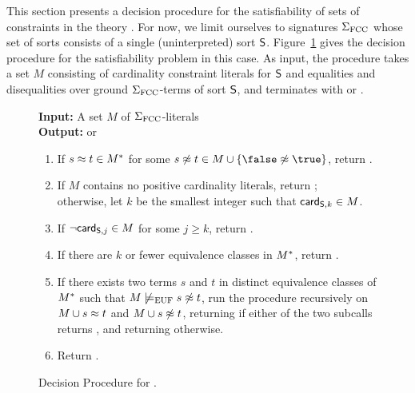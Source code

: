 \documentclass{svjour3}                     %
\begin{document}
This section presents a decision procedure for the satisfiability of 
sets of constraints in the theory \fcc.
For now, we limit ourselves to signatures $\Sigma_\fcc$ whose set of sorts 
consists of a single (uninterpreted) sort $\So$.
Figure~\ref{fig:dp-fcc} gives the decision procedure for the satisfiability problem
in this case.
As input, the procedure takes a set $M$ consisting of cardinality constraint literals 
for $\So$ and
equalities and disequalities over ground $\Sigma_\fcc$-terms of sort $\So$,
and terminates with \sat or \unsat.

\begin{figure}
\begin{framed}
{\bf Input:} A set $M$ of $\Sigma_\fcc$-literals \\
{\bf Output:} \sat or \unsat
\begin{enumerate}
\item 
If $s \teq t \in \cc M$ for some $s \tneq t \in M \cup \{\false \tneq \true\}$, return \unsat.
\item 
If $M$ contains no positive cardinality literals, return \sat; \\
otherwise, let $k$ be the smallest integer such that $\card[\So,k] \in M$.
\item
If $\neg \card[\So,j] \in M$ for some $j \geq k$, return \unsat.
\item 
If there are $k$ or fewer equivalence classes in $\cc M$, return \sat.
\item 
\label{it:split}
If there exists two terms $s$ and $t$ in distinct equivalence classes of $\cc M$ 
such that $M \not\ent[\euf] s \tneq t$,
run the procedure recursively on $M \cup s \teq t$ and $M \cup s \tneq t$, 
returning \sat if either of the two subcalls returns \sat, and returning \unsat otherwise.
\item 
\label{it:last}
Return \unsat.
\end{enumerate}
\end{framed}
\caption{Decision Procedure for \fcc.}
\label{fig:dp-fcc}
\end{figure}
\end{document}
